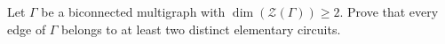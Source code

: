 Let $\Gamma$ be a biconnected multigraph with $\dim(\mathcal{Z}(\Gamma)) \geq 2$. Prove that every edge of $\Gamma$ belongs to at least two distinct elementary circuits.